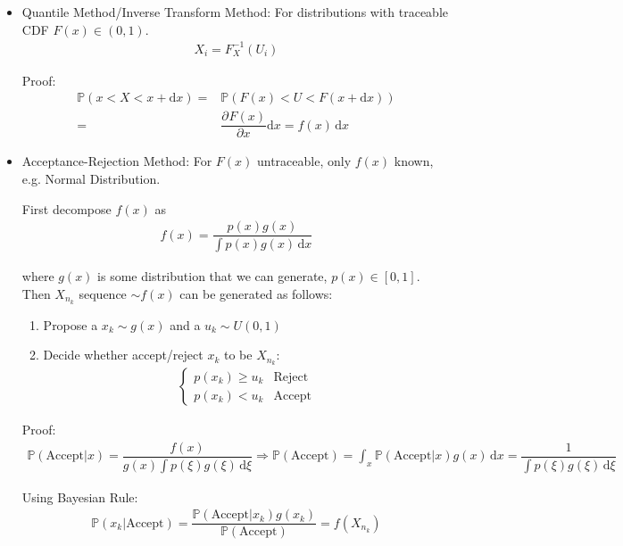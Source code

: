 \begin{itemize}[topsep=2pt,itemsep=0pt]
    \item Quantile Method/Inverse Transform Method: For distributions with traceable CDF $ F(x) \in (0,1)$.
    \begin{align}
         X_i=F^{-1}_X(U_i)
    \end{align}

    Proof:
    \begin{align}
        \mathbb{P}\left(x<X<x+\mathrm{d}x \right)=&\mathbb{P}\left(F(x)<U<F(x+\mathrm{d} x)\right)\\
        =&\dfrac{\partial^{} F(x)}{\partial x^{}}\mathrm{d}x =f(x)\,\mathrm{d}x
    \end{align}
    \item Acceptance-Rejection Method: For $ F(x) $ untraceable, only $ f(x) $ known, e.g. Normal Distribution.
    
    First decompose $ f(x) $ as 
    \begin{align}
        f(x)=\dfrac{p(x)g(x)}{\int p(x)g(x) \,\mathrm{d}x} 
    \end{align}
    
    where $ g(x) $ is some distribution that we can generate, $ p(x)\in [0,1] $. Then $ X_{n_k} $ sequence $ \sim f(x) $ can be generated as follows:
\begin{enumerate}[topsep=2pt,itemsep=2pt]
    \item Propose a $ x_k \sim g(x)$ and a $ u_k\sim U(0,1) $
    \item Decide whether accept/reject $ x_k $ to be $ X_{n_k} $:
    \begin{align}
        \begin{cases}
            p(x_k)\geq u_k&\text{Reject}\\
            p(x_k)<u_k&\text{Accept}
        \end{cases} 
    \end{align}
\end{enumerate}
    Proof:
    \begin{align}
        \mathbb{P}(\mathrm{Accept}|x )=\dfrac{f(x)}{g(x)\int p(\xi )g(\xi ) \,\mathrm{d}\xi }\Rightarrow \mathbb{P}(\mathrm{Accept} )=\int _x \mathbb{P}(\mathrm{Accept}|x )g(x)\,\mathrm{d}x=\dfrac{1}{\int p(\xi )g(\xi ) \,\mathrm{d}\xi}
    \end{align}

    Using Bayesian Rule:
    \begin{align}
        \mathbb{P}(x_k|\mathrm{Accept} )=\dfrac{\mathbb{P}(\mathrm{Accept}|x_k )g(x_k)}{\mathbb{P}(\mathrm{Accept} )}=f(X_{n_k}) 
    \end{align}


\end{itemize}
